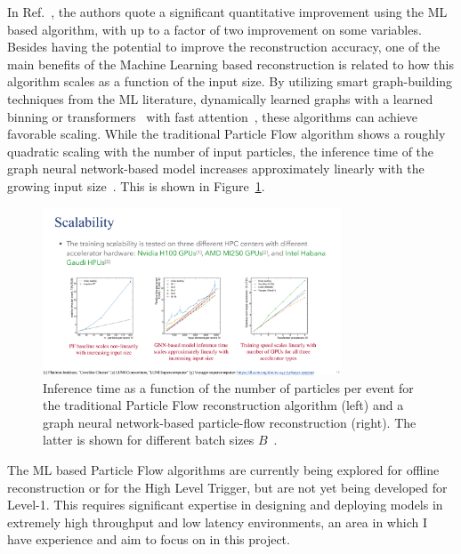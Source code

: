\documentclass[12pt]{iopart}
\begin{document}
In Ref.~\cite{mokhtar2023progress}, the authors quote a significant quantitative improvement using the ML based algorithm, with up to a factor of two improvement on some variables. Besides having the potential to improve the reconstruction accuracy, one of the main benefits of the Machine Learning based reconstruction is related to how this algorithm scales as a function of the input size. By utilizing smart graph-building techniques from the ML literature, dynamically learned graphs with a learned binning or transformers~\cite{vaswani2017attention} with fast attention~\cite{choromanski2022rethinking}, these algorithms can achieve favorable scaling. While the traditional Particle Flow algorithm shows a roughly quadratic scaling with the number of input particles, the inference time of the graph neural network-based model increases approximately linearly with the growing input size~\cite{Pata2023MLPF}. This is shown in Figure~\ref{fig:mlpf_comp}.
\begin{figure}[ht]
    \centering
    \includegraphics[width=0.79\textwidth]{figures/mlpf_compute.pdf}
    \caption{Inference time as a function of the number of particles per event for the traditional Particle Flow reconstruction algorithm (left) and a graph neural network-based particle-flow reconstruction (right). The latter is shown for different batch sizes $B$~\cite{Pata2023MLPF}.}
    \label{fig:mlpf_comp}
\end{figure}

The ML based Particle Flow algorithms are currently being explored for offline reconstruction or for the High Level Trigger, but are not yet being developed for Level-1. This requires significant expertise in designing and deploying models in extremely high throughput and low latency environments, an area in which I have experience and aim to focus on in this project.

\end{document}
